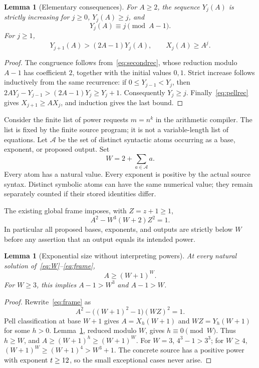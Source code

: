 \documentclass[11pt]{article}
\newtheorem{lemma}[theorem]{Lemma}
\theoremstyle{definition}\newtheorem{definition}[theorem]{Definition}
\theoremstyle{remark}\newtheorem{remark}[theorem]{Remark}
\begin{document}
\begin{lemma}[Elementary consequences]\label{lem:pellfacts}
For $A\ge2$, the sequence $Y_j(A)$ is strictly increasing for $j\ge0$, $Y_j(A)\ge j$, and
\[
 Y_j(A)\equiv j\pmod{A-1}.
\]
For $j\ge1$,
\[
 Y_{j+1}(A)>(2A-1)Y_j(A),\qquad X_j(A)\ge A^j.
\]
\end{lemma}
\begin{proof}
The congruence follows from~\eqref{eq:secondrec}, whose reduction modulo $A-1$ has coefficient $2$, together with the initial values $0,1$. Strict increase follows inductively from the same recurrence: if $0\le Y_{j-1}<Y_j$, then $2A Y_j-Y_{j-1}>(2A-1)Y_j\ge Y_j+1$. Consequently $Y_j\ge j$. Finally~\eqref{eq:pellrec} gives $X_{j+1}\ge A X_j$, and induction gives the last bound.
\end{proof}

Consider the finite list of power requests $m=n^k$ in the arithmetic compiler. The list is fixed by the finite source program; it is not a variable-length list of equations. Let $\mathcal A$ be the set of distinct syntactic atoms occurring as a base, exponent, or proposed output. Set
\begin{equation}\label{eq:W}
 W=2+\sum_{a\in\mathcal A}a.
\end{equation}
Every atom has a natural value. Every exponent is positive by the actual source syntax. Distinct symbolic atoms can have the same numerical value; they remain separately counted if their stored identities differ.

The existing global frame imposes, with $Z=z+1\ge1$,
\begin{equation}\label{eq:frame}
 A^2-W^3(W+2)Z^2=1.
\end{equation}
In particular all proposed bases, exponents, and outputs are strictly below $W$ before any assertion that an output equals its intended power.

\begin{lemma}[Exponential size without interpreting powers]\label{lem:frame}
At every natural solution of~\eqref{eq:W}--\eqref{eq:frame},
\[
 A\ge(W+1)^W.
\]
For $W\ge3$, this implies $A-1>W^3$ and $A-1>W$.
\end{lemma}
\begin{proof}
Rewrite~\eqref{eq:frame} as
\[
 A^2-\bigl((W+1)^2-1\bigr)(WZ)^2=1.
\]
Pell classification at base $W+1$ gives
$A=X_h(W+1)$ and $WZ=Y_h(W+1)$ for some $h>0$.
Lemma~\ref{lem:pellfacts}, reduced modulo $W$, gives $h\equiv0\pmod W$. Thus $h\ge W$, and $A\ge(W+1)^h\ge(W+1)^W$.
For $W=3$, $4^3-1>3^3$; for $W\ge4$, $(W+1)^W\ge(W+1)^4>W^3+1$. The concrete source has a positive power with exponent $t\ge12$, so the small exceptional cases never arise.
\end{proof}
\end{document}
